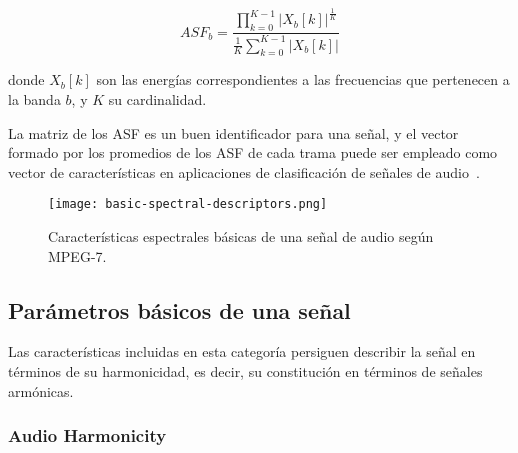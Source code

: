 \begin{equation}
    \label{eq:ASF}
    ASF_b = \frac{\prod_{k=0}^{K-1}{|X_{b}[k]|}^{\frac{1}{K}}}{\frac{1}{K}\sum_{k=0}^{K-1}{|X_{b}[k]|}}
\end{equation}

\noindent
donde $X_{b}[k]$ son las energías correspondientes a las frecuencias que pertenecen a la banda $b$, y $K$ su cardinalidad.

La matriz de los ASF es un buen identificador para una señal, y el vector formado por los promedios de los ASF de cada trama puede ser empleado como vector de características en aplicaciones de clasificación de señales de audio~\cite{Kim05}.

\begin{figure}[!h]
    \centering
    \texttt{[image: basic-spectral-descriptors.png]}
    \caption{Características espectrales básicas de una señal de audio según MPEG-7.}
    \label{img:basic-spectral-descriptors}
\end{figure}

\subsection{Parámetros básicos de una señal}\label{subsec:basicSignalParameters}

Las características incluidas en esta categoría persiguen describir la señal en términos de su harmonicidad, es decir, su constitución en términos de señales armónicas. %

\subsubsection{Audio Harmonicity}


